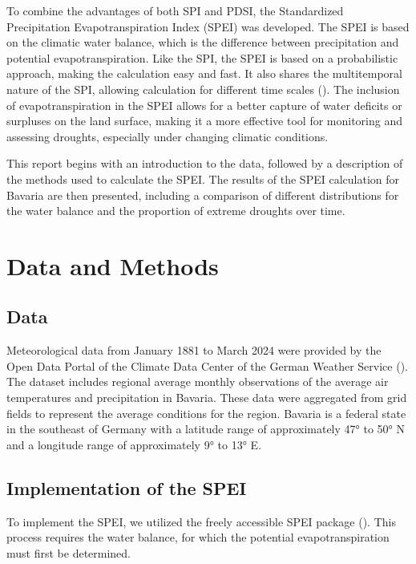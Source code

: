 \documentclass[
]{krantz}
\begin{document}
To combine the advantages of both SPI and PDSI, the Standardized Precipitation Evapotranspiration Index (SPEI) was developed. The SPEI is based on the climatic water balance, which is the difference between precipitation and potential evapotranspiration. Like the SPI, the SPEI is based on a probabilistic approach, making the calculation easy and fast. It also shares the multitemporal nature of the SPI, allowing calculation for different time scales (\citet{vicente}).
The inclusion of evapotranspiration in the SPEI allows for a better capture of water deficits or surpluses on the land surface, making it a more effective tool for monitoring and assessing droughts, especially under changing climatic conditions.

This report begins with an introduction to the data, followed by a description of the methods used to calculate the SPEI. The results of the SPEI calculation for Bavaria are then presented, including a comparison of different distributions for the water balance and the proportion of extreme droughts over time.

\section{Data and Methods}\label{data-and-methods}

\subsection{Data}\label{data}

Meteorological data from January 1881 to March 2024 were provided by the Open Data Portal of the Climate Data Center of the German Weather Service (\citet{dwd2024}). The dataset includes regional average monthly observations of the average air temperatures and precipitation in Bavaria. These data were aggregated from grid fields to represent the average conditions for the region.
Bavaria is a federal state in the southeast of Germany with a latitude range of approximately 47° to 50° N and a longitude range of approximately 9° to 13° E.

\subsection{Implementation of the SPEI}\label{implementation-of-the-spei}

To implement the SPEI, we utilized the freely accessible SPEI package (\citet{begueria2023}). This process requires the water balance, for which the potential evapotranspiration must first be determined.
\end{document}
